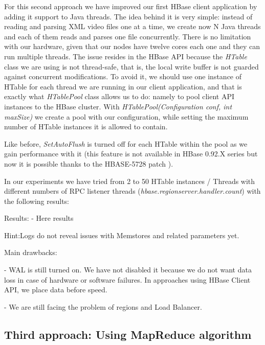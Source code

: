 For this second approach we have improved our first HBase client application by adding it support to Java threads. The idea behind it is very simple: instead of reading and parsing XML video files one at a time, we create now N Java threads and each of them reads and parses one file concurrently. There is no limitation with our hardware, given that our nodes have twelve cores each one and they can run multiple threads. The issue resides in the HBase API because the \textit{HTable} class we are using is not thread-safe, that is, the local write buffer is not guarded against concurrent modifications. To avoid it, we should use one instance of HTable for each thread we are running in our client application, and that is exactly what \textit{HTablePool} class allows us to do: namely to pool client API instances to the HBase cluster. With \textit{HTablePool(Configuration conf, int maxSize)} we create a pool with our configuration, while setting the maximum number of HTable instances it is allowed to contain. 
\par
Like before, \textit{SetAutoFlush} is turned off for each HTable within the pool as we gain performance with it (this feature is not available in HBase 0.92.X series but now it is possible thanks to the HBASE-5728 patch \cite{HBase5728}). 
\par
 In our experiments we have tried from 2 to 50 HTable instances / Threads with different numbers of RPC listener threads (\textit{hbase.regionserver.handler.count}) with the following results:
\par
{}
\par
Results: - Here results
\par
Hint:Logs do not reveal issues with Memstores and related parameters yet.

Main drawbacks:
\par
- WAL is still turned on. We have not disabled it because we do not want data loss in case of hardware or software failures. In approaches using HBase Client API, we place data before speed.
\par
- We are still facing the problem of regions and Load Balancer.



\subsection{Third approach: Using MapReduce algorithm}


